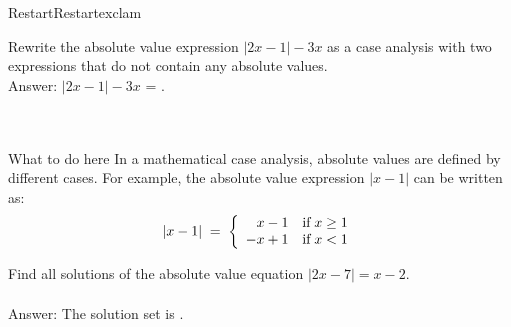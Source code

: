 \begin{MXContent}{Restart}{Restart}{exclam}
\begin{MExercise}
Rewrite the absolute value expression $|2x-1|-3x$ as a case analysis with two expressions that do not contain 
any absolute values.\\
Answer: $|2x-1|-3x$ = .\\
\ \\ \ \\
\begin{MHint}{What to do here}
In a mathematical case analysis, absolute values are defined by different cases. For example, the absolute value 
expression $|x-1|$ can be written as:
$$
|x-1| \;=\; \left\lbrace{\begin{array}{rl} x-1 & \text{if}\;x\geq 1 \\ -x+1 & \text{if}\; x<1 \end{array}}\right.
$$
\end{MHint}
\end{MExercise}

% 

\begin{MExercise}
Find all solutions of the absolute value equation $|2x-7|=x-2$.
\ \\ \ \\
Answer: The solution set is .\\
\end{MExercise}



\end{MXContent}
